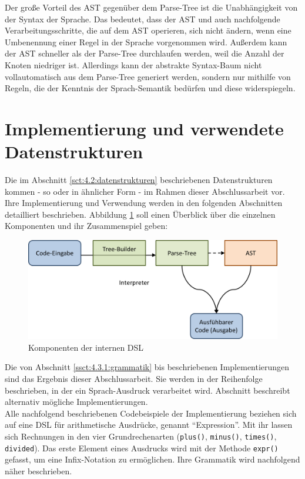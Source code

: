 Der große Vorteil des AST gegenüber dem Parse-Tree ist die Unabhängigkeit von der Syntax der Sprache. Das bedeutet, dass der AST und auch  nachfolgende Verarbeitungsschritte, die auf dem AST operieren, sich nicht ändern, wenn eine Umbenennung einer Regel in der Sprache vorgenommen wird. Außerdem kann der AST schneller als der Parse-Tree durchlaufen werden, weil die Anzahl der Knoten niedriger ist. Allerdings kann der abstrakte Syntax-Baum nicht vollautomatisch aus dem Parse-Tree generiert werden, sondern nur mithilfe von Regeln, die der Kenntnis der Sprach-Semantik bedürfen und diese widerspiegeln.



\section{Implementierung und verwendete Datenstrukturen}\label{ssct:4.3:implementierung}
Die im Abschnitt \ref{sct:4.2:datenstrukturen} beschriebenen Datenstrukturen kommen - so oder in ähnlicher Form - im Rahmen dieser Abschlussarbeit vor. Ihre Implementierung und Verwendung werden in den folgenden Abschnitten detailliert beschrieben. Abbildung \ref{fig:komponenten} soll einen Überblick über die einzelnen Komponenten und ihr Zusammenspiel geben:

\begin{figure}[H]
\centering\includegraphics[width=.8\textwidth]{images/kapitel4/komponenten.png}
\caption{Komponenten der internen DSL}
\label{fig:komponenten}
\end{figure}

Die von Abschnitt \ref{ssct:4.3.1:grammatik} bis  beschriebenen Implementierungen sind das Ergebnis dieser Abschlussarbeit. Sie werden in der Reihenfolge beschrieben, in der ein Sprach-Ausdruck verarbeitet wird. Abschnitt  beschreibt alternativ mögliche Implementierungen.\\
Alle nachfolgend beschriebenen Codebeispiele der Implementierung beziehen sich auf eine DSL für arithmetische Ausdrücke, genannt \textquotedblleft Expression\textquotedblright. Mit ihr lassen sich Rechnungen in den vier Grundrechenarten (\texttt{plus()}, \texttt{minus()}, \texttt{times()}, \texttt{divided}). Das erste Element eines Ausdrucks wird mit der Methode \texttt{expr()} gefasst, um eine Infix-Notation zu ermöglichen. Ihre Grammatik wird nachfolgend näher beschrieben.

